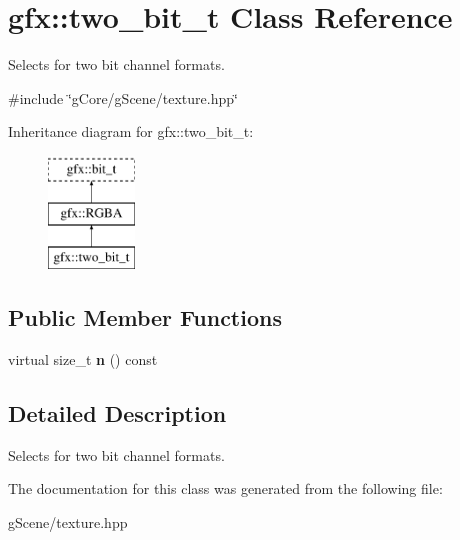\hypertarget{classgfx_1_1two__bit__t}{\section{gfx\-:\-:two\-\_\-bit\-\_\-t Class Reference}
\label{classgfx_1_1two__bit__t}
}


Selects for two bit channel formats.  




{\ttfamily \#include \char`\"{}g\-Core/g\-Scene/texture.\-hpp\char`\"{}}

Inheritance diagram for gfx\-:\-:two\-\_\-bit\-\_\-t\-:\begin{figure}[H]
\begin{center}
\leavevmode
\includegraphics[height=3.000000cm]{classgfx_1_1two__bit__t}
\end{center}
\end{figure}
\subsection*{Public Member Functions}
\begin{DoxyCompactItemize}
\item 
\hypertarget{classgfx_1_1two__bit__t_ad4846b43786dde72e9ea9762b04a11fd}{virtual size\-\_\-t {\bfseries n} () const }\label{classgfx_1_1two__bit__t_ad4846b43786dde72e9ea9762b04a11fd}

\end{DoxyCompactItemize}


\subsection{Detailed Description}
Selects for two bit channel formats. 

The documentation for this class was generated from the following file\-:\begin{DoxyCompactItemize}
\item 
g\-Scene/texture.\-hpp\end{DoxyCompactItemize}
